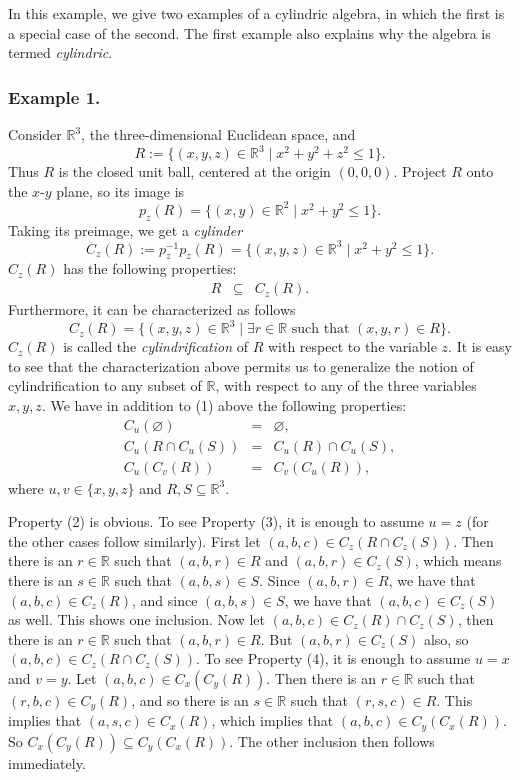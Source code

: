 \documentclass[12pt]{article}
\begin{document}
In this example, we give two examples of a cylindric algebra, in which the first is a special case of the second.  The first example also explains why the algebra is termed \emph{cylindric}.

\subsubsection*{Example 1.}

Consider $\mathbb{R}^3$, the three-dimensional Euclidean space, and $$R:=\lbrace (x,y,z)\in \mathbb{R}^3\mid x^2+y^2+z^2\le 1\rbrace.$$  Thus $R$ is the closed unit ball, centered at the origin $(0,0,0)$.  Project $R$ onto the $x$-$y$ plane, so its image is $$p_z(R)=\lbrace (x,y)\in \mathbb{R}^2\mid x^2+y^2\le 1\rbrace.$$  Taking its preimage, we get a \emph{cylinder} $$C_z(R):=p_z^{-1}p_z(R)=\lbrace (x,y,z)\in \mathbb{R}^3\mid x^2+y^2\le 1\rbrace.$$  $C_z(R)$ has the following properties:
\begin{eqnarray}
R&\subseteq& C_z(R).
\end{eqnarray}
Furthermore, it can be characterized as follows
$$C_z(R)=\lbrace (x,y,z)\in \mathbb{R}^3\mid \exists r\in \mathbb{R}\mbox{ such that }(x,y,r)\in R\rbrace.$$
$C_z(R)$ is called the \emph{cylindrification} of $R$ with respect to the variable $z$.
It is easy to see that the characterization above permits us to generalize the notion of cylindrification to any subset of $\mathbb{R}$, with respect to any of the three variables $x,y,z$.  We have in addition to (1) above the following properties:
\begin{eqnarray}
C_u(\varnothing)&=&\varnothing, \\
C_u(R\cap C_u(S))&=&C_u(R)\cap C_u(S), \\
C_u(C_v(R))&=&C_v(C_u(R)),
\end{eqnarray}
where $u,v\in \lbrace x,y,z\rbrace$ and $R,S\subseteq \mathbb{R}^3$.

Property (2) is obvious.  To see Property (3), it is enough to assume $u=z$ (for the other cases follow similarly).  First let $(a,b,c)\in C_z(R\cap C_z(S))$.  Then there is an $r\in \mathbb{R}$ such that $(a,b,r)\in R$ and $(a,b,r)\in C_z(S)$, which means there is an $s\in \mathbb{R}$ such that $(a,b,s)\in S$.  Since $(a,b,r)\in R$, we have that $(a,b,c)\in C_z(R)$, and since $(a,b,s)\in S$, we have that $(a,b,c)\in C_z(S)$ as well.  This shows one inclusion.  Now let $(a,b,c)\in C_z(R)\cap C_z(S)$, then there is an $r\in \mathbb{R}$ such that $(a,b,r)\in R$.  But $(a,b,r)\in C_z(S)$ also, so $(a,b,c)\in C_z(R\cap C_z(S))$.  To see Property (4), it is enough to assume $u=x$ and $v=y$.  Let $(a,b,c)\in C_x(C_y(R))$.  Then there is an $r\in \mathbb{R}$ such that $(r,b,c)\in C_y(R)$, and so there is an $s\in \mathbb{R}$ such that $(r,s,c)\in R$.  This implies that $(a,s,c)\in C_x(R)$, which implies that $(a,b,c)\in C_y(C_x(R))$.  So $C_x(C_y(R))\subseteq C_y(C_x(R))$.  The other inclusion then follows immediately.
\end{document}
